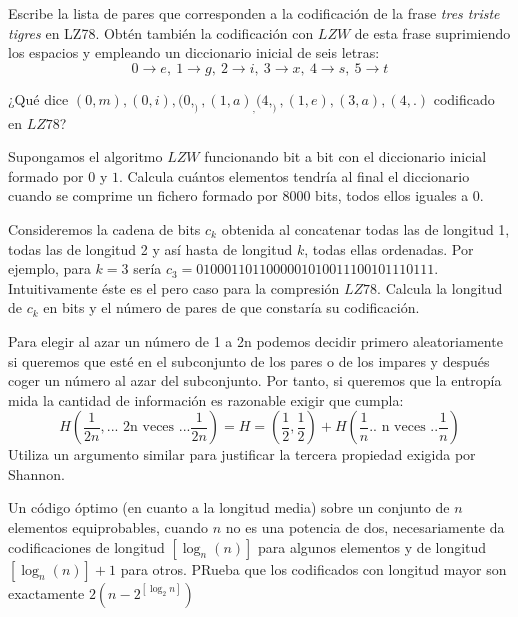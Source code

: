 \begin{problem}[14]
Escribe la lista de pares que corresponden a la codificación de la frase \textit{tres triste tigres} en LZ78. Obtén también la codificación con $LZW$ de esta frase suprimiendo los espacios y empleando un diccionario inicial de seis letras:
\[0 \to e, \ 1 \to g, \ 2 \to i, \ 3 \to x, \ 4 \to s, \ 5 \to t\]
\solution
\end{problem}

\begin{problem}[15]
¿Qué dice $(0,m),(0,i),(0,_),(1,a)_,(4,_),(1,e),(3,a),(4,.)$ codificado en $LZ78$?
\solution
\end{problem}

\begin{problem}[16]
Supongamos el algoritmo $LZW$ funcionando bit a bit con el diccionario inicial formado por $0$ y $1$. Calcula cuántos elementos tendría al final el diccionario cuando se comprime un fichero formado por 8000 bits, todos ellos iguales a 0.
\solution
\end{problem}

\begin{problem}[17]
Consideremos la cadena de bits $c_k$ obtenida al concatenar todas las de longitud 1, todas las de longitud 2 y así hasta de longitud $k$, todas ellas ordenadas. Por ejemplo, para $k=3$ sería $c_3=0100011011000001010011100101110111$. Intuitivamente éste es el pero caso para la compresión $LZ78$. Calcula la longitud de $c_k$ en bits y el número de pares de que constaría su codificación.
\solution
\end{problem}

\begin{problem}[18]
Para elegir al azar un número de 1 a 2n podemos decidir primero aleatoriamente si queremos que esté en el subconjunto de los pares o de los impares y después coger un número al azar del subconjunto. Por tanto, si queremos que la entropía mida la cantidad de información es razonable exigir que cumpla:
\[H \left( \frac{1}{2n},... \text{ 2n veces } ... \frac{1}{2n}\right)=H=\left(\frac{1}{2},\frac{1}{2}\right)+H \left(\frac{1}{n} .. \text{ n veces }.. \frac{1}{n} \right)\]
Utiliza un argumento similar para justificar la tercera propiedad exigida por Shannon.
\solution
\end{problem}

\begin{problem}[19]
Un código óptimo (en cuanto a la longitud media) sobre un conjunto de $n$ elementos equiprobables, cuando $n$ no es una potencia de dos, necesariamente da codificaciones de longitud $[\log_n (n)]$ para algunos elementos y de longitud $[\log_n (n)]+1$ para otros. PRueba que los codificados con longitud mayor son exactamente $2\left( n -2^{[\log_2 n]}\right)$
\solution
\end{problem}